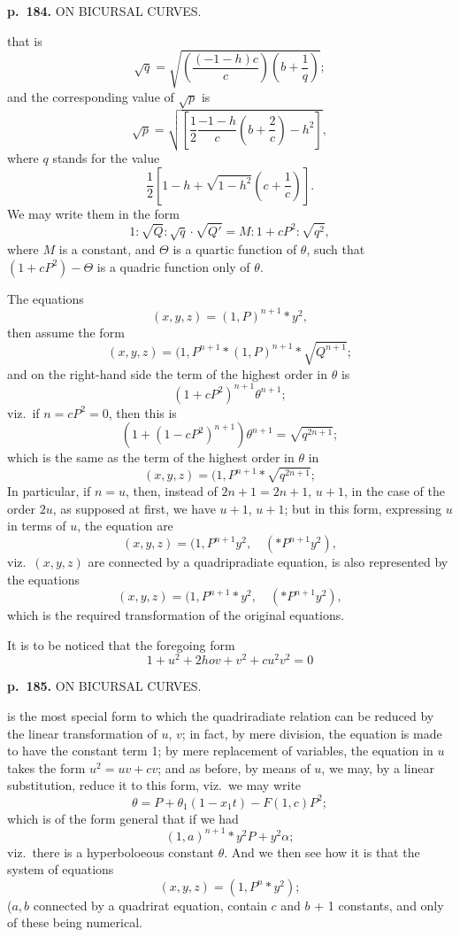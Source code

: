 \documentclass[11pt,a4paper]{article}
\begin{document}
\clearpage

\noindent
\textbf{p.~184.}  ON BICURSAL CURVES.

that is
\[
\sqrt{q} = \sqrt{\left( \frac{(-1 - h)c}{c} \right)(b + \frac{1}{q})};
\]
and the corresponding value of $\sqrt{p}$ is
\[
\sqrt{p} = \sqrt{\left[ \frac{1}{2} \frac{-1 - h}{c} \left( b + \frac{2}{c} \right) - h^2 \right]},
\]
where $q$ stands for the value
\[
\frac{1}{2}\left[1 - h + \sqrt{1 - h^2}\left( c + \frac{1}{c} \right)\right].
\]
We may write them in the form
\[
1 : \sqrt{Q} : \sqrt{q} \cdot \sqrt{Q'} = M : 1 + c P^2 : \sqrt{q^2},
\]
where $M$ is a constant, and $\Theta$ is a quartic function of $\theta$, such that $(1 + cP^2) - \Theta$ is a quadric function only of $\theta$.

The equations
\[
(x, y, z) = (1, P)^{n+1} \ast y^2,
\]
then assume the form
\[
(x, y, z) = (1, P^{n+1} \ast (1, P)^{n+1} \ast \sqrt{Q^{n+1}};
\]
and on the right-hand side the term of the highest order in $\theta$ is
\[
(1 + c P^2)^{n+1} \theta^{n+1};
\]
viz.\ if $n = c P^2 = 0$, then this is
\[
(1 + (1 - c P^2)^{n+1}) \theta^{n+1} = \sqrt{q^{2n+1}};
\]
which is the same as the term of the highest order in $\theta$ in
\[
(x, y, z) = (1, P^{n+1} \ast \sqrt{q^{2n+1}};
\]
In particular, if $n = u$, then, instead of $2n + 1 = 2n + 1$, $u + 1$, in the case of the order $2u$, as supposed at first, we have $u + 1$, $u + 1$; but in this form, expressing $u$ in terms of $u$, the equation are
\[
(x, y, z) = (1, P^{n+1} y^2, \quad (\ast P^{n+1} y^2),
\]
viz.\ $(x, y, z)$ are connected by a quadripradiate equation, is also represented by the equations
\[
(x, y, z) = (1, P^{n+1} \ast y^2, \quad (\ast P^{n+1} y^2),
\]
which is the required transformation of the original equations.

It is to be noticed that the foregoing form
\[
1 + u^2 + 2hov + v^2 + c u^2 v^2 = 0
\]

\clearpage

\noindent
\textbf{p.~185.}  ON BICURSAL CURVES.

is the most special form to which the quadriradiate relation can be reduced by the linear transformation of $u$, $v$; in fact, by mere division, the equation is made to have the constant term 1; by mere replacement of variables, the equation in $u$ takes the form $u^2 = uv + cv$; and as before, by means of $u$, we may, by a linear substitution, reduce it to this form, viz.\ we may write
\[
\theta = P + \theta_1(1 - x_1 t) - F(1, c)P^2;
\]
which is of the form general that if we had
\[
(1, a)^{n+1} \ast y^2 P + y^2 \alpha;
\]
viz.\ there is a hyperboloeous constant $\theta$. And we then see how it is that the system of equations
\[
(x, y, z) = (1, P^n \ast y^2);
\]
($a, b$ connected by a quadrirat equation, contain $c$ and $b$ + 1 constants, and only of these being numerical.
\end{document}
